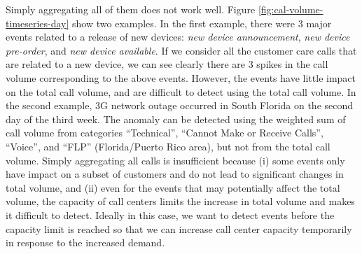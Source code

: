 Simply aggregating all of them does not work well. 
Figure \ref{fig:cal-volume-timeseries-day} show two examples.
In the first example, there were 3 major events related to a release of new devices:
{\em new device announcement},
{\em new device pre-order},
and {\em new device available}. 
If we consider all the customer care calls that are related to 
a new device, we can see clearly there are 3 spikes in the call volume corresponding 
to the above events. However, the events have little impact on the
total call volume, and are difficult to detect using the total call volume.
In the second example, 3G network outage occurred in South Florida on the second day of the third week.
The anomaly can be detected using the weighted sum of call volume from categories
``Technical'', ``Cannot Make or Receive Calls'', ``Voice'', and
``FLP'' (Florida/Puerto Rico area), but not from 
the total call volume.
Simply aggregating all calls is insufficient because (i) some events only have
impact on a subset of customers and do not lead to significant changes
in total volume, and (ii) even for the events that may potentially
affect the total volume, the capacity of call centers limits the
increase in total volume and makes it difficult to detect. Ideally in this case, we want to detect
events before the capacity limit is reached so that we can increase
call center capacity temporarily in response to the increased demand.


